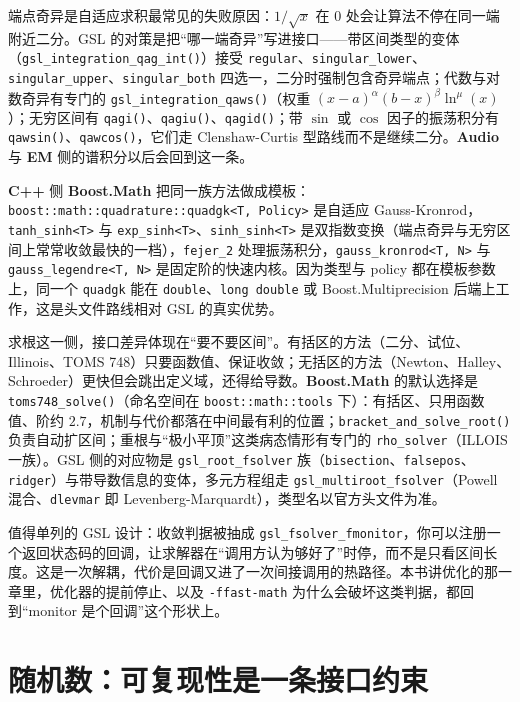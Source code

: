\documentclass[12pt,a4paper,fontset=fandol]{ctexbook}
\newcommand{\Fn}[1]{\texttt{#1()}}
\newcommand{\Tp}[1]{\texttt{#1}}
\newcommand{\Bk}{\allowbreak}
\newcommand{\Lib}[1]{\textbf{#1}}
\newcommand{\Lang}[1]{\textsf{\bfseries #1}}
\newcommand{\CPP}{\Lang{C++}}
\newcommand{\AUD}{\Lang{Audio}}
\newcommand{\EMW}{\Lang{EM}}
\begin{document}
端点奇异是自适应求积最常见的失败原因：$1/\sqrt{x}$ 在 $0$ 处会让算法不停在同一端附近二分。GSL 的对策是把``哪一端奇异''写进接口——带区间类型的变体（\Fn{gsl\_{\Bk}integration\Bk\_{\Bk}qag\Bk\_{\Bk}int}）接受 \Tp{regular}、\Tp{singular\_{\Bk}lower}、\Tp{singular\_{\Bk}upper}、\Tp{singular\_{\Bk}both} 四选一，二分时强制包含奇异端点；代数与对数奇异有专门的 \Fn{gsl\_{\Bk}integration\Bk\_{\Bk}qaws}（权重 $(x-a)^{\alpha}(b-x)^{\beta}\ln^{\mu}(x)$）；无穷区间有 \Fn{qagi}、\Fn{qagiu}、\Fn{qagid}；带 $\sin$ 或 $\cos$ 因子的振荡积分有 \Fn{qawsin}、\Fn{qawcos}，它们走 Clenshaw-Curtis 型路线而不是继续二分。\AUD{} 与 \EMW{} 侧的谱积分以后会回到这一条。

\CPP{} 侧 \Lib{Boost.Math} 把同一族方法做成模板：\Tp{boost::{\Bk}math::{\Bk}quadrature\Bk::{\Bk}quadgk<T, Policy>} 是自适应 Gauss-Kronrod，\Tp{tanh\_{\Bk}sinh<T>} 与 \Tp{exp\_{\Bk}sinh<T>}、\Tp{sinh\_{\Bk}sinh<T>} 是双指数变换（端点奇异与无穷区间上常常收敛最快的一档），\Tp{fejer\_2} 处理振荡积分，\Tp{gauss\_{\Bk}kronrod<T, N>} 与 \Tp{gauss\Bk\_{\Bk}legendre<T, N>} 是固定阶的快速内核。因为类型与 policy 都在模板参数上，同一个 \Tp{quadgk} 能在 \Tp{double}、\Tp{long double} 或 Boost.{\Bk}Multiprecision 后端上工作，这是头文件路线相对 GSL 的真实优势。

求根这一侧，接口差异体现在``要不要区间''。有括区的方法（二分、试位、Illinois、TOMS 748）只要函数值、保证收敛；无括区的方法（Newton、Halley、Schroeder）更快但会跳出定义域，还得给导数。\Lib{Boost.Math} 的默认选择是 \Fn{toms748\_solve}（命名空间在 \Tp{boost::math::tools} 下）：有括区、只用函数值、阶约 $2.7$，机制与代价都落在中间最有利的位置；\Fn{bracket\Bk\_and\Bk\_solve\Bk\_root} 负责自动扩区间；重根与``极小平顶''这类病态情形有专门的 \Tp{rho\_solver}（ILLOIS 一族）。GSL 侧的对应物是 \Tp{gsl\_root\Bk\_fsolver} 族（\Tp{bisection}、\Tp{falsepos}、\Tp{ridger}）与带导数信息的变体，多元方程组走 \Tp{gsl\_multiroot\Bk\_fsolver}（Powell 混合、\Tp{dlevmar} 即 Levenberg-Marquardt），类型名以官方头文件为准。

值得单列的 GSL 设计：收敛判据被抽成 \Tp{gsl\_fsolver\Bk\_fmonitor}，你可以注册一个返回状态码的回调，让求解器在``调用方认为够好了''时停，而不是只看区间长度。这是一次解耦，代价是回调又进了一次间接调用的热路径。本书讲优化的那一章里，优化器的提前停止、以及 \Tp{-ffast-math} 为什么会破坏这类判据，都回到``monitor 是个回调''这个形状上。

\section{随机数：可复现性是一条接口约束}
\end{document}
